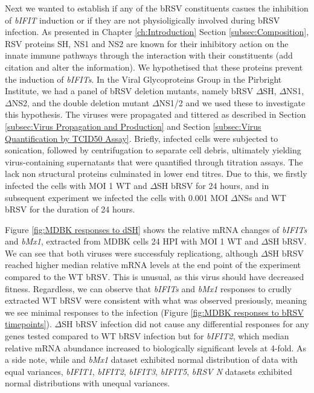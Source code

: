 Next we wanted to establish if any of the bRSV constituents casues the inhibition of \textit{bIFIT} induction or if they are not physioligically involved during bRSV infection. As presented in Chapter \ref{ch:Introduction} Section \ref{subsec:Composition}, RSV proteins SH, NS1 and NS2 are known for their inhibitory action on the innate immune pathways through the interaction with their constituents (add citation and alter the information). We hypothetised that these proteins prevent the induction of \textit{bIFITs}. In the Viral Glycoproteins Group in the Pirbright Institute, we had a panel of bRSV deletion mutants, namely bRSV \(\Delta\)SH, \(\Delta\)NS1, \(\Delta\)NS2, and the double deletion mutant \(\Delta\)NS1/2 and we used these to investigate this hypothesis. The viruses were propagated and tittered as described in Section \ref{subsec:Virus Propagation and Production} and Section \ref{subsec:Virus Quantification by TCID50 Assay}. Briefly, infected cells were subjected to sonication, followed by centrifugation to separate cell debris, ultimately yielding virus-containing supernatants that were quantified through titration assays. The lack non structural proteins culminated in lower end titres. Due to this, we firstly infected the cells with MOI 1 WT and \(\Delta\)SH bRSV for 24 hours, and in subsequent experiment we infected the cells with 0.001 MOI \(\Delta\)NSs and WT bRSV for the duration of 24 hours.

Figure \ref{fig:MDBK responses to dSH} shows the relative mRNA changes of \textit{bIFITs} and \textit{bMx1}, extracted from MDBK cells 24 HPI with MOI 1 WT and \(\Delta\)SH bRSV. We can see that both viruses were successfuly replicationg, although \(\Delta\)SH bRSV reached higher median relative mRNA levels at the end point of the experiment compared to the WT bRSV. This is unusual, as this virus should have decreased fitness. Regardless, we can observe that \textit{bIFITs} and \textit{bMx1} responses to crudly extracted WT bRSV were consistent with what was observed presiously, meaning we see minimal responses to the infection (Figure \ref{fig:MDBK responses to bRSV timepoints}). \(\Delta\)SH bRSV infection did not cause any differential responses for any genes tested compared to WT bRSV infection but for \textit{bIFIT2}, which median relative mRNA abundance increased to biologically significant levels at 4-fold. As a side note, while  and \textit{bMx1} dataset exhibited normal distribution of data with equal variances, \textit{bIFIT1}, \textit{bIFIT2}, \textit{bIFIT3}, \textit{bIFIT5}, \textit{bRSV N} datasets exhibited normal distributions with unequal variances.

